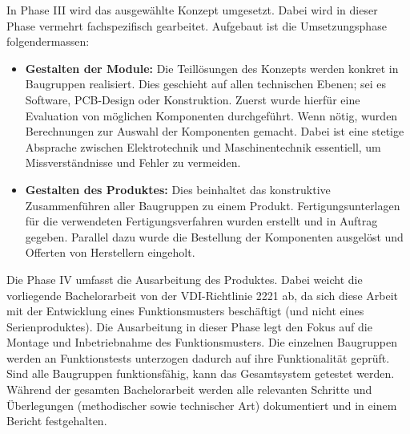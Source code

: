 In Phase III wird das ausgewählte Konzept umgesetzt. Dabei wird in dieser Phase vermehrt fachspezifisch gearbeitet. Aufgebaut ist die Umsetzungsphase folgendermassen:
\begin{itemize}
	\item \textbf{Gestalten der Module:} Die Teillösungen des Konzepts werden konkret in Baugruppen realisiert. Dies geschieht auf allen technischen Ebenen; sei es Software, PCB-Design oder Konstruktion. Zuerst wurde hierfür eine Evaluation von möglichen Komponenten durchgeführt. Wenn nötig, wurden Berechnungen zur Auswahl der Komponenten gemacht. Dabei ist eine stetige Absprache zwischen Elektrotechnik und Maschinentechnik essentiell, um Missverständnisse und Fehler zu vermeiden.
	
	\item \textbf{Gestalten des Produktes:} Dies beinhaltet das konstruktive Zusammenführen aller Baugruppen zu einem Produkt. Fertigungsunterlagen für die verwendeten Fertigungsverfahren wurden erstellt und in Auftrag gegeben. Parallel dazu wurde die Bestellung der Komponenten ausgelöst und Offerten von Herstellern eingeholt. 
\end{itemize}

Die Phase IV umfasst die Ausarbeitung des Produktes. Dabei weicht die vorliegende Bachelorarbeit von der VDI-Richtlinie 2221 ab, da sich diese Arbeit mit der Entwicklung eines Funktionsmusters beschäftigt (und nicht eines Serienproduktes).
\newline
Die Ausarbeitung in dieser Phase legt den Fokus auf die Montage und Inbetriebnahme des Funktionsmusters. Die einzelnen Baugruppen werden an Funktionstests unterzogen dadurch auf ihre Funktionalität geprüft. Sind alle Baugruppen funktionsfähig, kann das Gesamtsystem getestet werden.
\newline
Während der gesamten Bachelorarbeit werden alle relevanten Schritte und Überlegungen (methodischer sowie technischer Art) dokumentiert und in einem Bericht festgehalten.